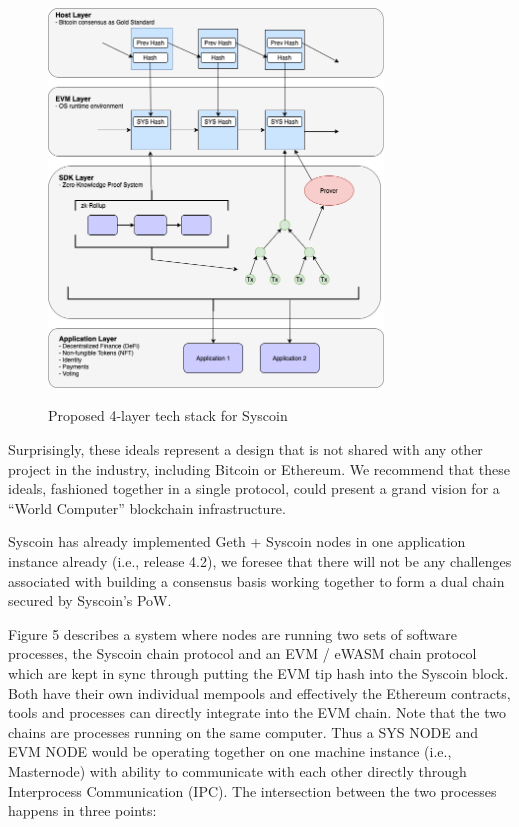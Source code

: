 \documentclass[peerreview]{ieeesyscoin}
\begin{document}
\begin{figure}[h!]
\includegraphics[width=3.5in]{img/4_layer.png}
\label{fig:tech_stack}
\caption{Proposed 4-layer tech stack for Syscoin} 
\end{figure} 

Surprisingly, these ideals represent a design that is not shared with any other project in the industry, including Bitcoin or Ethereum. We recommend that these ideals, fashioned together in a single protocol, could present a grand vision for a “World Computer” blockchain infrastructure.

Syscoin has already implemented Geth + Syscoin nodes in one application instance already (i.e., release 4.2), we foresee that there will not be any challenges associated with building a consensus basis working together to form a dual chain secured by Syscoin’s PoW.

Figure 5 describes a system where nodes are running two sets of software processes, the Syscoin chain protocol and an EVM / eWASM chain protocol which are kept in sync through putting the EVM tip hash into the Syscoin block. Both have their own individual mempools and effectively the Ethereum contracts, tools and processes can directly integrate into the EVM chain. Note that the two chains are processes running on the same computer. Thus a SYS NODE and EVM NODE would be operating together on one machine instance (i.e., Masternode) with ability to communicate with each other directly through Interprocess Communication (IPC). The intersection between the two processes happens in three points:
\end{document}
